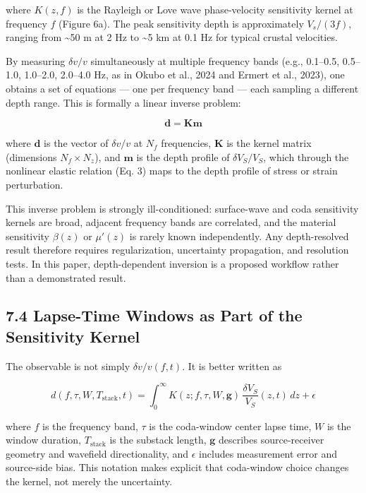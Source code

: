 \documentclass[draft]{agujournal2019}
\begin{document}
where \(K(z, f)\) is the Rayleigh or Love wave phase-velocity
sensitivity kernel at frequency \(f\) (Figure 6a). The peak sensitivity
depth is approximately \(V_s / (3f)\), ranging from \textasciitilde{}50
m at 2 Hz to \textasciitilde{}5 km at 0.1 Hz for typical crustal
velocities.

By measuring \(\delta v/v\) simultaneously at multiple frequency bands
(e.g., 0.1--0.5, 0.5--1.0, 1.0--2.0, 2.0--4.0 Hz, as in Okubo et al.,
2024 and Ermert et al., 2023), one obtains a set of equations --- one
per frequency band --- each sampling a different depth range. This is
formally a linear inverse problem:

\[\mathbf{d} = \mathbf{K} \mathbf{m} \tag{14}\]

where \(\mathbf{d}\) is the vector of \(\delta v/v\) at \(N_f\)
frequencies, \(\mathbf{K}\) is the kernel matrix (dimensions
\(N_f \times N_z\)), and \(\mathbf{m}\) is the depth profile of
\(\delta V_S / V_S\), which through the nonlinear elastic relation (Eq.
3) maps to the depth profile of stress or strain perturbation.

This inverse problem is strongly ill-conditioned: surface-wave and coda
sensitivity kernels are broad, adjacent frequency bands are correlated,
and the material sensitivity \(\beta(z)\) or \(\mu'(z)\) is rarely known
independently. Any depth-resolved result therefore requires
regularization, uncertainty propagation, and resolution tests. In this
paper, depth-dependent inversion is a proposed workflow rather than a
demonstrated result.

\subsection{7.4 Lapse-Time Windows as Part of the Sensitivity
Kernel}\label{lapse-time-windows-as-part-of-the-sensitivity-kernel}

The observable is not simply \(\delta v/v(f,t)\). It is better written
as

\[d(f,\tau,W,T_{\mathrm{stack}},t) = \int_0^\infty K(z; f,\tau,W,\mathbf{g}) \, \frac{\delta V_S}{V_S}(z,t) \, dz + \epsilon \tag{15}\]

where \(f\) is the frequency band, \(\tau\) is the coda-window center
lapse time, \(W\) is the window duration, \(T_{\mathrm{stack}}\) is the
substack length, \(\mathbf{g}\) describes source-receiver geometry and
wavefield directionality, and \(\epsilon\) includes measurement error
and source-side bias. This notation makes explicit that coda-window
choice changes the kernel, not merely the uncertainty.
\end{document}
